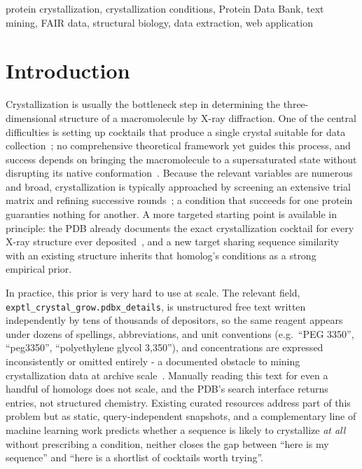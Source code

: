 \begin{IEEEkeywords}
protein crystallization, crystallization conditions, Protein Data Bank, text mining, FAIR data, structural biology, data extraction, web application
\end{IEEEkeywords}

\section{Introduction}

Crystallization is usually the bottleneck step in determining the three-dimensional structure of a macromolecule by X-ray diffraction. One
of the central difficulties is setting up cocktails that produce a single crystal suitable for data collection~\cite{kwon2013modeling}; no
comprehensive theoretical framework yet guides this process, and success depends on bringing the macromolecule to a supersaturated state without disrupting its native conformation~\cite{mcphersoncudney2014optimization}. Because the relevant variables are numerous and 
broad, crystallization is typically approached by screening an extensive trial matrix and refining successive rounds~\cite{luft2014crystallization,mcpherson2014introduction}; a condition that succeeds for one protein guaranties nothing for another.
A more targeted starting point is available in principle: the PDB already documents the exact crystallization cocktail for every X-ray structure ever deposited~\cite{berman2000pdb,burley2021rcsb}, and a new target sharing sequence similarity with an existing structure inherits that homolog's conditions as a strong empirical prior.

In practice, this prior is very hard to use at scale. The relevant field, \texttt{exptl\_crystal\_grow.pdbx\_details}, is unstructured free text written independently by tens of thousands of depositors, so the same reagent appears under dozens of spellings, abbreviations, and unit conventions (e.g.\ ``PEG 3350'', ``peg3350'', ``polyethylene glycol 3,350''), and concentrations are expressed inconsistently or omitted entirely - a documented obstacle to mining crystallization data at archive scale~\cite{kirkwood2015analysis}. Manually reading this text for even a handful of homologs does not scale, and the PDB's search interface returns entries, not structured chemistry. Existing curated resources address part of this problem but as static, query-independent snapshots, and a complementary line of machine learning work predicts whether a sequence is likely to crystallize \emph{at all} without prescribing a condition, neither closes the gap between ``here is my sequence'' and ``here is a shortlist of cocktails worth trying''.

